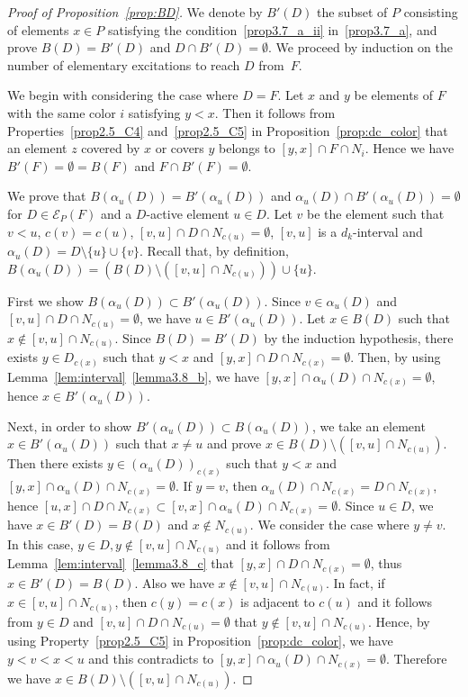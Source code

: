 \documentclass[ALCO,ThmDefs,Unicode,epreuves]{cedram}
\newcommand\EE{\mathcal{E}}
\begin{document}
\begin{proof}[Proof of Proposition~\ref{prop:BD}]
We denote by $B'(D)$ the subset of $P$ consisting of elements $x \in P$ satisfying the condition~\ref{prop3.7_a_ii} in~\ref{prop3.7_a},
and prove $B(D) = B'(D)$ and $D \cap B'(D) = \emptyset$.
We proceed by induction on the number of elementary excitations to reach $D$ from~$F$.

We begin with considering the case where $D = F$.
Let $x$ and $y$ be elements of $F$ with the same color $i$ satisfying $y<x$.
Then it follows from Properties~\ref{prop2.5_C4} and~\ref{prop2.5_C5} in Proposition~\ref{prop:dc_color} that 
an element $z$ covered by $x$ or covers $y$ belongs to $[y,x] \cap F \cap N_i$.
Hence we have $B'(F) = \emptyset = B(F)$ and $F \cap B'(F) = \emptyset$.

We prove that $B(\alpha_u(D)) = B'(\alpha_u(D))$ and $\alpha_u(D) \cap B'(\alpha_u(D)) = \emptyset$ 
for $D \in \EE_P(F)$ and a $D$-active element $u \in D$.
Let $v$ be the element such that $v<u$,
$c(v)=c(u)$, $[v,u] \cap D \cap N_{c(u)} = \emptyset$,
$[v,u]$ is a $d_k$-interval
and $\alpha_u(D) = D \setminus \{ u \} \cup \{ v \}$.
Recall that, by definition, 
$B(\alpha_u(D)) = \left( B(D) \setminus ([v,u] \cap N_{c(u)}) \right) \cup \{ u \}$.

First we show $B(\alpha_u(D)) \subset B'(\alpha_u(D))$.
Since $v \in \alpha_u(D)$ and $[v,u] \cap D \cap N_{c(u)} = \emptyset$, 
we have $u \in B'(\alpha_u(D))$.
Let $x \in B(D)$ such that $x \not\in [v,u] \cap N_{c(u)}$.
Since $B(D) = B'(D)$ by the induction hypothesis, 
there exists $y \in D_{c(x)}$ such that $y<x$ and $[y,x] \cap D \cap N_{c(x)} = \emptyset$.
Then, by using Lemma~\ref{lem:interval}~\ref{lemma3.8_b}, 
we have $[y,x] \cap \alpha_u(D) \cap N_{c(x)} = \emptyset$, hence $x \in B'(\alpha_u(D))$.

Next, in order to show $B'(\alpha_u(D)) \subset B(\alpha_u(D))$, 
we take an element $x \in B'(\alpha_u(D))$ such that $x \neq u$ 
and prove $x \in B(D) \setminus ([v,u] \cap N_{c(u)})$.
Then there exists $y \in (\alpha_u(D))_{c(x)}$ such that 
$y<x$ and $[y,x] \cap \alpha_u(D) \cap N_{c(x)} = \emptyset$.
If $y = v$, then $\alpha_u(D)\cap N_{c(x)}=D\cap N_{c(x)}$, 
hence $[u,x] \cap D \cap N_{c(x)} \subset [v,x] \cap \alpha_u(D) \cap N_{c(x)} = \emptyset$.
Since $u \in D$, we have $x \in B'(D)=B(D)$ and $x \not\in N_{c(u)}$.
We consider the case where $y \neq v$.
In this case, $y \in D, y\not\in [v,u]\cap N_{c(u)}$ 
and it follows from Lemma~\ref{lem:interval}~\ref{lemma3.8_c} 
that $[y,x] \cap D \cap N_{c(x)} = \emptyset$,
thus $x\in B'(D)=B(D)$.
Also we have $x \not\in [v,u] \cap N_{c(u)}$.
In fact, if $x \in [v,u] \cap N_{c(u)}$, 
then $c(y) = c(x)$ is adjacent to $c(u)$ 
and it follows from $y \in D$ and $[v,u] \cap D \cap N_{c(u)} = \emptyset$ that $y \not\in [v,u]\cap N_{c(u)}$.
Hence, by using Property~\ref{prop2.5_C5} in Proposition~\ref{prop:dc_color}, 
we have $y < v < x < u$ and 
this contradicts to $[y,x] \cap \alpha_u(D) \cap N_{c(x)} = \emptyset$.
Therefore we have $x \in B(D) \setminus ([v,u] \cap N_{c(u)})$.


\end{proof}
\end{document}
